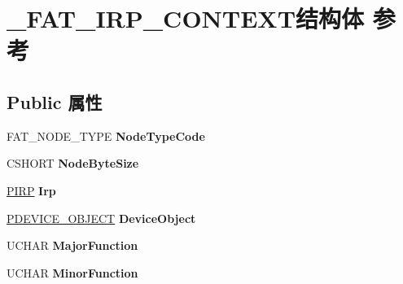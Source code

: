 \hypertarget{struct___f_a_t___i_r_p___c_o_n_t_e_x_t}{}\section{\+\_\+\+F\+A\+T\+\_\+\+I\+R\+P\+\_\+\+C\+O\+N\+T\+E\+X\+T结构体 参考}
\label{struct___f_a_t___i_r_p___c_o_n_t_e_x_t}
\subsection*{Public 属性}
\begin{DoxyCompactItemize}
\item 
\mbox{\label{struct___f_a_t___i_r_p___c_o_n_t_e_x_t_a1a7813854cd6db0420c4a063dee5cdea}} 
F\+A\+T\+\_\+\+N\+O\+D\+E\+\_\+\+T\+Y\+PE {\bfseries Node\+Type\+Code}
\item 
\mbox{\label{struct___f_a_t___i_r_p___c_o_n_t_e_x_t_a2e277579cb0bddf7533dbdcb2474f9a6}} 
C\+S\+H\+O\+RT {\bfseries Node\+Byte\+Size}
\item 
\mbox{\label{struct___f_a_t___i_r_p___c_o_n_t_e_x_t_a341f672b2ee1c9defec94b74080f1c17}} 
\hyperlink{interfacevoid}{P\+I\+RP} {\bfseries Irp}
\item 
\mbox{\label{struct___f_a_t___i_r_p___c_o_n_t_e_x_t_af60196f7b1b53a4ff58588487b7d9caf}} 
\hyperlink{struct___d_e_v_i_c_e___o_b_j_e_c_t}{P\+D\+E\+V\+I\+C\+E\+\_\+\+O\+B\+J\+E\+CT} {\bfseries Device\+Object}
\item 
\mbox{\label{struct___f_a_t___i_r_p___c_o_n_t_e_x_t_a78a3d5a56950260ef055ea1ebcc98ec4}} 
U\+C\+H\+AR {\bfseries Major\+Function}
\item 
\mbox{\label{struct___f_a_t___i_r_p___c_o_n_t_e_x_t_acd08cc5dbe387724cd76b9f5b7ef747e}} 
U\+C\+H\+AR {\bfseries Minor\+Function}
\item 
\mbox{\label{struct___f_a_t___i_r_p___c_o_n_t_e_x_t_ab165a870d75c6e0d496e182b20078d38}} 

\end{DoxyCompactItemize}
